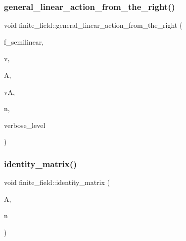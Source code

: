 \subsubsection{\texorpdfstring{general\+\_\+linear\+\_\+action\+\_\+from\+\_\+the\+\_\+right()}{general\_linear\_action\_from\_the\_right()}}
{\footnotesize\ttfamily void finite\+\_\+field\+::general\+\_\+linear\+\_\+action\+\_\+from\+\_\+the\+\_\+right (\begin{DoxyParamCaption}\item[{\mbox{\hyperlink{galois_8h_a09fddde158a3a20bd2dcadb609de11dc}{I\+NT}}}]{f\+\_\+semilinear,  }\item[{\mbox{\hyperlink{galois_8h_a09fddde158a3a20bd2dcadb609de11dc}{I\+NT}} $\ast$}]{v,  }\item[{\mbox{\hyperlink{galois_8h_a09fddde158a3a20bd2dcadb609de11dc}{I\+NT}} $\ast$}]{A,  }\item[{\mbox{\hyperlink{galois_8h_a09fddde158a3a20bd2dcadb609de11dc}{I\+NT}} $\ast$}]{vA,  }\item[{\mbox{\hyperlink{galois_8h_a09fddde158a3a20bd2dcadb609de11dc}{I\+NT}}}]{n,  }\item[{\mbox{\hyperlink{galois_8h_a09fddde158a3a20bd2dcadb609de11dc}{I\+NT}}}]{verbose\+\_\+level }\end{DoxyParamCaption})}

\mbox{\label{classfinite__field_a4688997f80b8721560bccec986c23413}} 
\subsubsection{\texorpdfstring{identity\+\_\+matrix()}{identity\_matrix()}}
{\footnotesize\ttfamily void finite\+\_\+field\+::identity\+\_\+matrix (\begin{DoxyParamCaption}\item[{\mbox{\hyperlink{galois_8h_a09fddde158a3a20bd2dcadb609de11dc}{I\+NT}} $\ast$}]{A,  }\item[{\mbox{\hyperlink{galois_8h_a09fddde158a3a20bd2dcadb609de11dc}{I\+NT}}}]{n }\end{DoxyParamCaption})}

\mbox{\label{classfinite__field_a13e75e8165b27464935b50368ee8313c}} 
